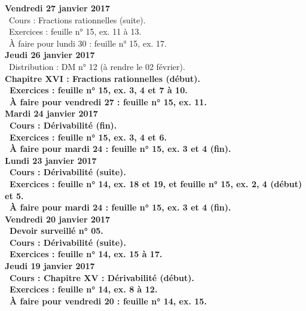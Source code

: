 \documentclass[12pt,a4paper]{article}
\begin{document}
\noindent\textbf{Vendredi 27 janvier 2017}\\
\bu\ Cours : Fractions rationnelles (suite).\\
\bu\ Exercices : feuille n° 15, ex. 11 à 13.\\
\bu\ À faire pour lundi 30 : feuille n° 15, ex. 17.\vspace{.4cm}\\  

\noindent\textbf{Jeudi 26 janvier 2017}\\
\bu\ Distribution : DM n° 12 (à rendre le 02 février).\\
\bf Chapitre XVI \rm : Fractions rationnelles (début).\\
\bu\ Exercices : feuille n° 15, ex. 3, 4 et 7 à 10.\\
\bu\ À faire pour vendredi 27 : feuille n° 15, ex. 11.\vspace{.4cm}\\  

\noindent\textbf{ Mardi 24 janvier 2017} \\
\bu\ Cours : Dérivabilité (fin).\\
\bu\ Exercices : feuille n° 15, ex. 3, 4 et 6.\\
\bu\ À faire pour mardi 24 : feuille n° 15, ex. 3 et 4 (fin).\vspace{.4cm}\\  

\noindent\textbf{ Lundi 23 janvier 2017} \\
\bu\ Cours : Dérivabilité (suite).\\
\bu\ Exercices : feuille n° 14, ex. 18 et 19, et feuille n° 15, ex. 2, 4 (début) et 5.\\
\bu\ À faire pour mardi 24 : feuille n° 15, ex. 3 et 4 (fin).\vspace{.4cm}\\  

\noindent\textbf{Vendredi 20 janvier 2017}\\
\bu\ Devoir surveillé n° 05.\\
\bu\ Cours : Dérivabilité (suite).\\
\bu\ Exercices : feuille n° 14, ex. 15 à 17.\vspace{.4cm}\\

\noindent\textbf{Jeudi 19 janvier 2017}\\
\bu\ Cours : \bf Chapitre XV \rm : Dérivabilité (début).\\
\bu\ Exercices : feuille n° 14, ex. 8 à 12.\\
\bu\ À faire pour vendredi 20 : feuille n° 14, ex. 15.\vspace{.4cm}\\ 
\end{document}
